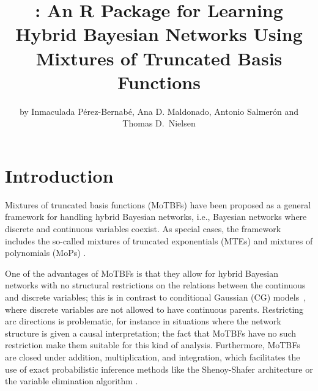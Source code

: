 \title{: An R Package for Learning Hybrid Bayesian Networks Using Mixtures of Truncated Basis Functions}
\author{by Inmaculada Pérez-Bernabé, Ana D. Maldonado, Antonio Salmerón and Thomas D.\ Nielsen}

\maketitle


\section{Introduction}

Mixtures of truncated basis functions (MoTBFs) \citep{Lan12} have  been proposed as a
general framework for handling hybrid Bayesian networks, i.e., Bayesian networks where discrete
and continuous variables coexist. As special cases, the framework includes the so-called mixtures of truncated exponentials
(MTEs) \citep{Mor01} and mixtures of polynomials (MoPs) \citep{She11,LoCru12}.

One of the advantages of MoTBFs is that they allow for hybrid Bayesian networks with
no structural restrictions on the relations between the continuous and discrete variables; this is in contrast
to conditional Gaussian (CG) models~\citep{Lau92}, where discrete variables are not 
allowed to have continuous parents. Restricting arc directions is problematic, for instance in situations where the
network structure is given a causal interpretation; the fact that MoTBFs have no such restriction make
them suitable for this kind of analysis. Furthermore, MoTBFs are closed under addition, multiplication, and integration,
which facilitates the use of exact probabilistic inference methods like the Shenoy-Shafer architecture \citep{She90} or
the variable elimination algorithm \citep{Zha96}.

